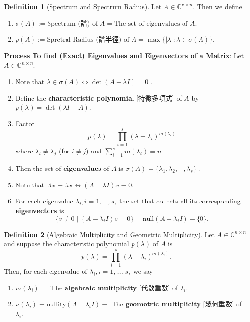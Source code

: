 \documentclass{article}
\theoremstyle{definition}
\newtheorem{definition}{Definition}[section]
\numberwithin{theorem}{section}
\numberwithin{equation}{section}
\begin{document}
\begin{definition}[Spectrum and Spectrum Radius]
    Let $A \in \mathbb{C}^{n \times n}$. Then we define
\begin{enumerate}
\item $\sigma(A) := \text{Spectrum (譜) of } A = \text{The set of eigenvalues of } A$.
\item $\rho(A) := \text{Sprctral Radius (譜半徑) of } A = \max \{ |\lambda| : \lambda \in \sigma(A) \}$.
\end{enumerate}
\end{definition}

\textbf{Process To find (Exact) Eigenvalues and Eigenvectors of a Matrix}:
Let $A \in \mathbb{C}^{n \times n}$.
\begin{enumerate}
\item Note that $\lambda \in \sigma(A) \Leftrightarrow \det(A - \lambda I) = 0$ .
\item Define the \textbf{characteristic polynomial} [特徵多項式] of $A$ by $p(\lambda) = \det(\lambda I - A)$.
\item Factor
  \[
   p(\lambda) = \prod_{i=1}^{s} (\lambda - \lambda_i)^{m(\lambda_i)}
   \]
  where $\lambda_i \neq \lambda_j$ (for $i \neq j$) and $\sum\limits_{i=1}^{s} m(\lambda_i) = n$.
\item Then the set of \textbf{eigenvalues} of $A$ is $\sigma(A) = \{ \lambda_1,\lambda_2, \cdots, \lambda_s \}$ .
\item Note that $Ax = \lambda x \Leftrightarrow  (A-\lambda I) x = 0$.
\item For each eigenvalue $\lambda_i, i=1,\ldots,s,$ the set that collects all its corresponding \textbf{eigenvectors} is
  \[
   \{ v \neq 0 \mid (A-\lambda_i I) v =0 \}= \text{null}( A-\lambda_i I )- \{ 0 \}.
   \]
\end{enumerate}

\begin{definition}[Algebraic Multiplicity and Geometric Multiplicity]
    Let $A \in \mathbb{C}^{n \times n}$ and suppose the characteristic polynomial $p(\lambda)$ of $A$ is
\[
p(\lambda) = \prod_{i=1}^{s} (\lambda - \lambda_i)^{m(\lambda_i)}.
\]
Then, for each eigenvalue of $\lambda_i, i=1,\ldots,s,$ we say
\begin{enumerate}
\item $m(\lambda_i) =$ The \textbf{algebraic multiplicity} [代數重數] of $\lambda_i$.
\item $n(\lambda_i) = \text{nullity}(A - \lambda_i I) =$ The \textbf{geometric multiplicity} [幾何重數] of $\lambda_i$.
\end{enumerate}
\end{definition}
\end{document}
